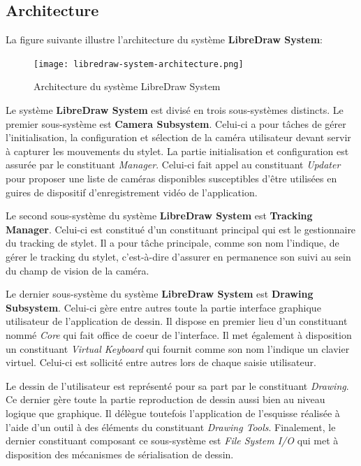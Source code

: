 \documentclass[11pt,a4paper,oldfontcommands]{memoir}
\begin{document}
\newpage

\subsection{Architecture}

La figure suivante illustre l'architecture du système \textbf{LibreDraw System}:

\begin{figure}[H]
\centering
\texttt{[image: libredraw-system-architecture.png]}
\caption{Architecture du système LibreDraw System}
\end{figure}

Le système \textbf{LibreDraw System} est divisé en trois sous-systèmes distincts. Le premier sous-système est \textbf{Camera Subsystem}. Celui-ci a pour tâches de gérer l'initialisation, la configuration et sélection de la caméra utilisateur devant servir à capturer les mouvements du stylet. La partie initialisation et configuration est assurée par le constituant \textit{Manager}. Celui-ci fait appel au constituant \textit{Updater} pour proposer une liste de caméras disponibles susceptibles d'être utilisées en guires de dispositif d'enregistrement vidéo de l'application.

Le second sous-système du système \textbf{LibreDraw System} est \textbf{Tracking Manager}. Celui-ci est constitué d'un constituant principal qui est le gestionnaire du tracking de stylet. Il a pour tâche principale, comme son nom l'indique, de gérer le tracking du stylet, c'est-à-dire d'assurer en permanence son suivi au sein du champ de vision de la caméra.

Le dernier sous-système du système \textbf{LibreDraw System} est \textbf{Drawing Subsystem}. Celui-ci gère entre autres toute la partie interface graphique utilisateur de l'application de dessin. Il dispose en premier lieu d'un constituant nommé \textit{Core} qui fait office de coeur de l'interface. Il met également à disposition un constituant \textit{Virtual Keyboard} qui fournit comme son nom l'indique un clavier virtuel. Celui-ci est sollicité entre autres lors de chaque saisie utilisateur.

Le dessin de l'utilisateur est représenté pour sa part par le constituant \textit{Drawing}. Ce dernier gère toute la partie reproduction de dessin aussi bien au niveau logique que graphique. Il délègue toutefois l'application de l'esquisse réalisée à l'aide d'un outil à des éléments du constituant \textit{Drawing Tools}. Finalement, le dernier constituant composant ce sous-système est \textit{File System I/O} qui met à disposition des mécanismes de sérialisation de dessin.
\end{document}
